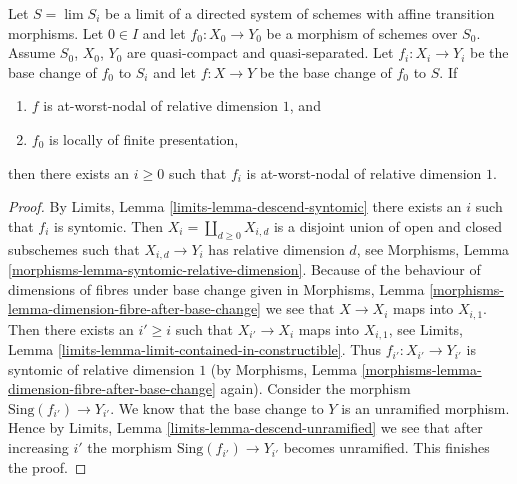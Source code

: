 \begin{lemma}
\label{lemma-descend-nodal-family}
Let $S = \lim S_i$ be a limit of a directed system of schemes
with affine transition morphisms.
Let $0 \in I$ and let $f_0 : X_0 \to Y_0$ be a morphism of schemes over $S_0$.
Assume $S_0$, $X_0$, $Y_0$ are quasi-compact and quasi-separated.
Let $f_i : X_i \to Y_i$ be the base change of $f_0$ to $S_i$ and
let $f : X \to Y$ be the base change of $f_0$ to $S$.
If
\begin{enumerate}
\item $f$ is at-worst-nodal of relative dimension $1$, and
\item $f_0$ is locally of finite presentation,
\end{enumerate}
then there exists an $i \geq 0$ such that $f_i$ is at-worst-nodal
of relative dimension $1$.
\end{lemma}

\begin{proof}
By Limits, Lemma \ref{limits-lemma-descend-syntomic}
there exists an $i$ such that $f_i$ is syntomic.
Then $X_i = \coprod_{d \geq 0} X_{i, d}$ is a disjoint union of
open and closed subschemes such that $X_{i, d} \to Y_i$
has relative dimension $d$, see
Morphisms, Lemma \ref{morphisms-lemma-syntomic-relative-dimension}.
Because of the behaviour of dimensions of fibres under base change given in
Morphisms, Lemma \ref{morphisms-lemma-dimension-fibre-after-base-change}
we see that $X \to X_i$ maps into $X_{i, 1}$.
Then there exists an $i' \geq i$ such that $X_{i'} \to X_i$
maps into $X_{i, 1}$, see
Limits, Lemma \ref{limits-lemma-limit-contained-in-constructible}.
Thus $f_{i'} : X_{i'} \to Y_{i'}$ is syntomic of relative dimension $1$
(by Morphisms, Lemma \ref{morphisms-lemma-dimension-fibre-after-base-change}
again).
Consider the morphism $\text{Sing}(f_{i'}) \to Y_{i'}$.
We know that the base change to $Y$ is an unramified morphism.
Hence by Limits, Lemma \ref{limits-lemma-descend-unramified}
we see that after increasing $i'$ the morphism
$\text{Sing}(f_{i'}) \to Y_{i'}$ becomes unramified.
This finishes the proof.
\end{proof}











